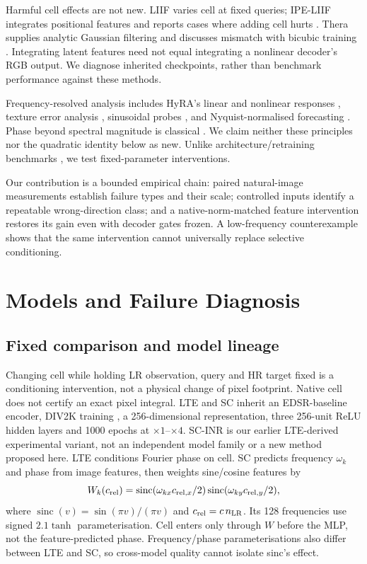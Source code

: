 Harmful cell effects are not new. LIIF varies cell at fixed queries;
IPE-LIIF integrates positional features and reports cases where adding
cell hurts \cite{liu2021ipe}. Thera supplies analytic Gaussian filtering
and discusses mismatch with bicubic training \cite{becker2025thera}.
Integrating latent features need not equal integrating a nonlinear
decoder's RGB output. We diagnose inherited checkpoints, rather than
benchmark performance against these methods.

Frequency-resolved analysis includes HyRA's linear and nonlinear responses
\cite{fsds2024}, texture error analysis \cite{magid2022texture}, sinusoidal
probes \cite{kawai2026frequency}, and Nyquist-normalised forecasting
\cite{wang2026scaleanchoring}. Phase beyond spectral magnitude is classical
\cite{oppenheim1981phase}. We claim neither these principles nor the
quadratic identity below as new. Unlike architecture/retraining benchmarks
\cite{nasir2026empirical}, we test fixed-parameter interventions.

Our contribution is a bounded empirical chain: paired natural-image
measurements establish failure types and their scale; controlled inputs
identify a repeatable wrong-direction class; and a native-norm-matched
feature intervention restores its gain even with decoder gates frozen.
A low-frequency counterexample shows that the same intervention cannot
universally replace selective conditioning.

\section{Models and Failure Diagnosis}
\label{sec:recovery}
\subsection{Fixed comparison and model lineage}
Changing cell while holding LR observation, query and HR target fixed is
a conditioning intervention, not a physical change of pixel footprint.
Native cell does not certify an exact pixel integral.
LTE and SC inherit an EDSR-baseline encoder, DIV2K training
\cite{agustsson2017div2k}, a 256-dimensional representation, three
256-unit ReLU hidden layers and 1000 epochs at $\times1$--$\times4$.
SC-INR is our earlier LTE-derived experimental variant, not an independent
model family or a new method proposed here. LTE conditions Fourier phase
on cell. SC predicts frequency $\omega_k$ and phase from image features,
then weights sine/cosine features by
\begin{equation}
 W_k(c_{\rm rel})=\operatorname{sinc}(\omega_{kx}c_{{\rm rel},x}/2)
                 \operatorname{sinc}(\omega_{ky}c_{{\rm rel},y}/2),
 \label{eq:sc}
\end{equation}
where $\operatorname{sinc}(v)=\sin(\pi v)/(\pi v)$ and
$c_{\rm rel}=c\,n_{\rm LR}$. Its 128 frequencies use signed $2.1\tanh$
parameterisation. Cell enters only through $W$ before the MLP, not the
feature-predicted phase. Frequency/phase parameterisations also differ
between LTE and SC, so cross-model quality cannot isolate sinc's effect.

